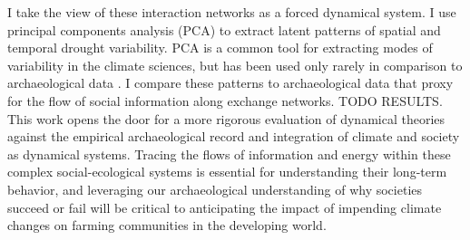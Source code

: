 \documentclass[10pt]{iopart}
\begin{document}

I take the view of these interaction networks as a forced dynamical system. I use principal components analysis (PCA) to extract latent patterns of spatial and temporal drought variability. PCA is a common tool for extracting modes of variability in the climate sciences, but has been used only rarely in comparison to archaeological data \parencite{Weiss1982, Cordell2007}. I compare these patterns to archaeological data that proxy for the flow of social information along exchange networks. TODO RESULTS. This work opens the door for a more rigorous evaluation of dynamical theories against the empirical archaeological record and integration of climate and society as dynamical systems. Tracing the flows of information and energy within these complex social-ecological systems is essential for understanding their long-term behavior, and leveraging our archaeological understanding of why societies succeed or fail will be critical to anticipating the impact of impending climate changes on farming communities in the developing world.
\end{document}
